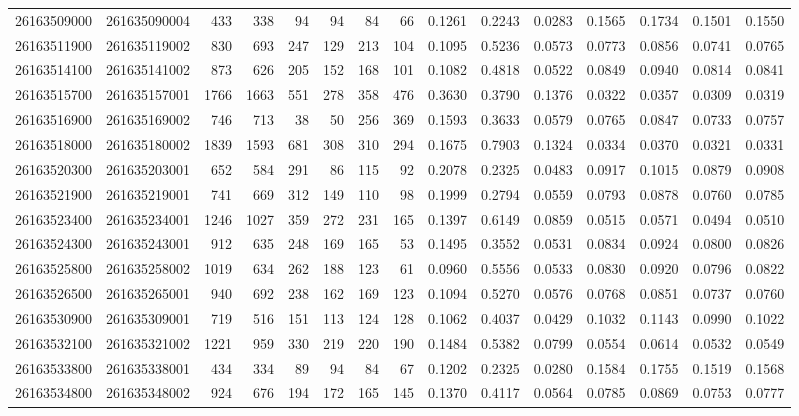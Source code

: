 \documentclass[11pt]{article}
\begin{document}
\begin{landscape}
\begin{longtable}{r|r|r|r|r|r|r|r|r|r|r|r|r|r|r}
26163509000 & 261635090004 & 433 & 338 & 94 & 94 & 84 & 66 & 0.1261 & 0.2243 & 0.0283 & 0.1565 & 0.1734 & 0.1501 & 0.1550 \\
26163511900 & 261635119002 & 830 & 693 & 247 & 129 & 213 & 104 & 0.1095 & 0.5236 & 0.0573 & 0.0773 & 0.0856 & 0.0741 & 0.0765 \\
26163514100 & 261635141002 & 873 & 626 & 205 & 152 & 168 & 101 & 0.1082 & 0.4818 & 0.0522 & 0.0849 & 0.0940 & 0.0814 & 0.0841 \\
26163515700 & 261635157001 & 1766 & 1663 & 551 & 278 & 358 & 476 & 0.3630 & 0.3790 & 0.1376 & 0.0322 & 0.0357 & 0.0309 & 0.0319 \\
26163516900 & 261635169002 & 746 & 713 & 38 & 50 & 256 & 369 & 0.1593 & 0.3633 & 0.0579 & 0.0765 & 0.0847 & 0.0733 & 0.0757 \\
26163518000 & 261635180002 & 1839 & 1593 & 681 & 308 & 310 & 294 & 0.1675 & 0.7903 & 0.1324 & 0.0334 & 0.0370 & 0.0321 & 0.0331 \\
26163520300 & 261635203001 & 652 & 584 & 291 & 86 & 115 & 92 & 0.2078 & 0.2325 & 0.0483 & 0.0917 & 0.1015 & 0.0879 & 0.0908 \\
26163521900 & 261635219001 & 741 & 669 & 312 & 149 & 110 & 98 & 0.1999 & 0.2794 & 0.0559 & 0.0793 & 0.0878 & 0.0760 & 0.0785 \\
26163523400 & 261635234001 & 1246 & 1027 & 359 & 272 & 231 & 165 & 0.1397 & 0.6149 & 0.0859 & 0.0515 & 0.0571 & 0.0494 & 0.0510 \\
26163524300 & 261635243001 & 912 & 635 & 248 & 169 & 165 & 53 & 0.1495 & 0.3552 & 0.0531 & 0.0834 & 0.0924 & 0.0800 & 0.0826 \\
26163525800 & 261635258002 & 1019 & 634 & 262 & 188 & 123 & 61 & 0.0960 & 0.5556 & 0.0533 & 0.0830 & 0.0920 & 0.0796 & 0.0822 \\
26163526500 & 261635265001 & 940 & 692 & 238 & 162 & 169 & 123 & 0.1094 & 0.5270 & 0.0576 & 0.0768 & 0.0851 & 0.0737 & 0.0760 \\
26163530900 & 261635309001 & 719 & 516 & 151 & 113 & 124 & 128 & 0.1062 & 0.4037 & 0.0429 & 0.1032 & 0.1143 & 0.0990 & 0.1022 \\
26163532100 & 261635321002 & 1221 & 959 & 330 & 219 & 220 & 190 & 0.1484 & 0.5382 & 0.0799 & 0.0554 & 0.0614 & 0.0532 & 0.0549 \\
26163533800 & 261635338001 & 434 & 334 & 89 & 94 & 84 & 67 & 0.1202 & 0.2325 & 0.0280 & 0.1584 & 0.1755 & 0.1519 & 0.1568 \\
26163534800 & 261635348002 & 924 & 676 & 194 & 172 & 165 & 145 & 0.1370 & 0.4117 & 0.0564 & 0.0785 & 0.0869 & 0.0753 & 0.0777 \\

\end{longtable}
\end{landscape}
\end{document}
